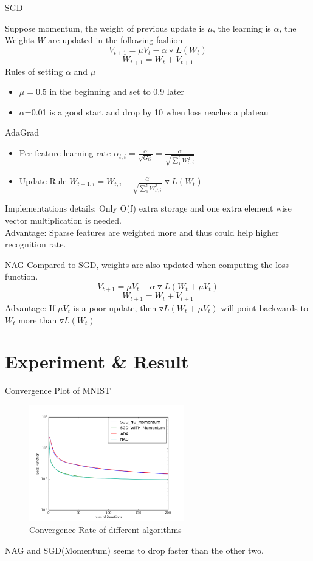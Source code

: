 \documentclass{beamer}
\begin{document}
\begin{frame}{SGD}

Suppose momentum, the weight of previous update is $\mu$, the learning is $\alpha$, the Weights $W$ are updated in the following fashion
$$
V_{t+1}=\mu V_t-\alpha \triangledown L(W_t)
$$
$$
W_{t+1}=W_t+V_{t+1}
$$
Rules of setting $\alpha$ and $\mu$
\begin{itemize}
\item $\mu=0.5$ in the beginning and set to $0.9$ later 
\item $\alpha$=0.01 is a good start and drop by 10 when loss reaches a plateau
\end{itemize}
\end{frame}

\begin{frame}{AdaGrad}
\begin{itemize}
 \item Per-feature learning rate $ \alpha_{t,i}=\frac{\alpha}{\sqrt{G_{ti}}}=\frac{\alpha}{\sqrt{\sum_1^t W_{t',i}^2}} $
 \item Update Rule $W_{t+1,i}=W_{t,i}-\frac{\alpha}{\sqrt{\sum_1^t W_{t',i}^2}} \triangledown L(W_t)$
 \end{itemize}
 Implementations details: Only O(f) extra storage and one extra element wise vector multiplication is needed.\\
 Advantage: Sparse features are weighted more and thus could help higher recognition rate.
\end{frame}

\begin{frame}{NAG}
Compared to SGD, weights are also updated when computing the loss function.
$$
V_{t+1}=\mu V_t-\alpha \triangledown L(W_t+\mu V_t)
$$
$$
W_{t+1}=W_t+V_{t+1}
$$
Advantage: If $\mu V_t$ is a poor update, then $\triangledown L(W_t+\mu V_t)$ will point backwards to $W_t$ more than $\triangledown L(W_t)$
\end{frame}

\section{Experiment \& Result}
\begin{frame}{Convergence Plot of MNIST}
\begin{figure}[h!]
\centering
\includegraphics[width=0.6\textwidth]{Mnist_Convergence.png}
\caption{Convergence Rate of different algorithms}
\end{figure}
NAG and SGD(Momentum) seems to drop faster than the other two.
\end{frame}
\end{document}

